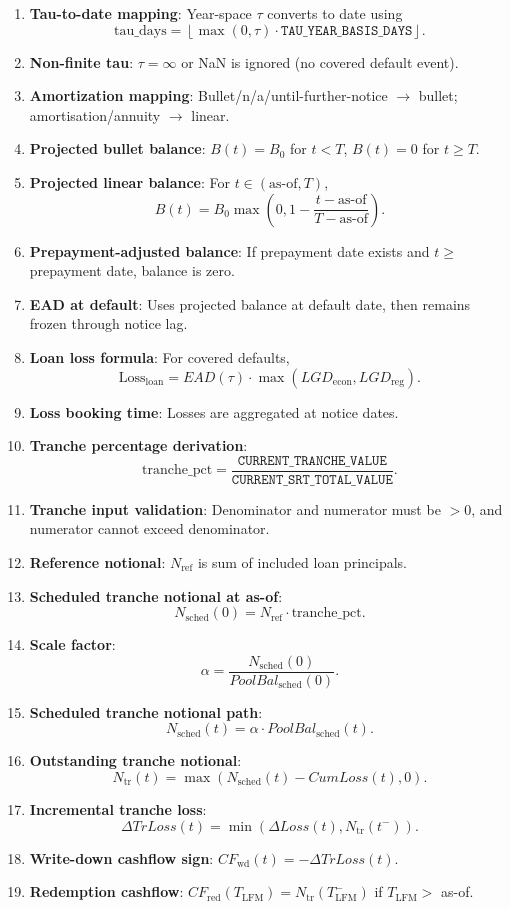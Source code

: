 \documentclass[11pt]{article}
\begin{document}
\begin{enumerate}[label=\arabic*),leftmargin=*,align=left]
\item \textbf{Tau-to-date mapping}: Year-space \(\tau\) converts to date using
\[
\text{tau\_days}=\left\lfloor \max(0,\tau)\cdot \texttt{TAU\_YEAR\_BASIS\_DAYS}\right\rfloor.
\]
\item \textbf{Non-finite tau}: \(\tau=\infty\) or NaN is ignored (no covered default event).
\item \textbf{Amortization mapping}: Bullet/n/a/until-further-notice \(\rightarrow\) bullet; amortisation/annuity \(\rightarrow\) linear.
\item \textbf{Projected bullet balance}: \(B(t)=B_0\) for \(t< T\), \(B(t)=0\) for \(t\ge T\).
\item \textbf{Projected linear balance}: For \(t\in(\text{as-of},T)\),
\[
B(t)=B_0\max\left(0,1-\frac{t-\text{as-of}}{T-\text{as-of}}\right).
\]
\item \textbf{Prepayment-adjusted balance}: If prepayment date exists and \(t\ge\) prepayment date, balance is zero.
\item \textbf{EAD at default}: Uses projected balance at default date, then remains frozen through notice lag.
\item \textbf{Loan loss formula}: For covered defaults,
\[
\text{Loss}_{\text{loan}}=EAD(\tau)\cdot \max(LGD_{\text{econ}},LGD_{\text{reg}}).
\]
\item \textbf{Loss booking time}: Losses are aggregated at notice dates.

\item \textbf{Tranche percentage derivation}: 
\[
\text{tranche\_pct}=\frac{\texttt{CURRENT\_TRANCHE\_VALUE}}{\texttt{CURRENT\_SRT\_TOTAL\_VALUE}}.
\]
\item \textbf{Tranche input validation}: Denominator and numerator must be \(>0\), and numerator cannot exceed denominator.
\item \textbf{Reference notional}: \(N_{\text{ref}}\) is sum of included loan principals.
\item \textbf{Scheduled tranche notional at as-of}:
\[
N_{\text{sched}}(0)=N_{\text{ref}}\cdot \text{tranche\_pct}.
\]
\item \textbf{Scale factor}: 
\[
\alpha=\frac{N_{\text{sched}}(0)}{PoolBal_{\text{sched}}(0)}.
\]
\item \textbf{Scheduled tranche notional path}: 
\[
N_{\text{sched}}(t)=\alpha\cdot PoolBal_{\text{sched}}(t).
\]
\item \textbf{Outstanding tranche notional}: 
\[
N_{\text{tr}}(t)=\max(N_{\text{sched}}(t)-CumLoss(t),0).
\]
\item \textbf{Incremental tranche loss}: 
\[
\Delta TrLoss(t)=\min(\Delta Loss(t),N_{\text{tr}}(t^-)).
\]
\item \textbf{Write-down cashflow sign}: \(CF_{\text{wd}}(t)=-\Delta TrLoss(t)\).
\item \textbf{Redemption cashflow}: \(CF_{\text{red}}(T_{\text{LFM}})=N_{\text{tr}}(T_{\text{LFM}}^-)\) if \(T_{\text{LFM}}>\) as-of.


\end{enumerate}
\end{document}
